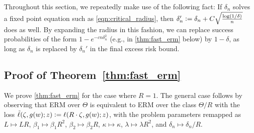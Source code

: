 \documentclass[11pt]{article} %
\newcommand{\pref}[1]{\cref{#1}}
\theoremstyle{theorem}  %
\theoremstyle{plain}
\newcommand{\ls}{\ell}
\newcommand{\ldef}{\vcentcolon=}
\begin{document}
Throughout this section, we repeatedly make use of the following fact:
If $\delta_n$ solves a fixed point equation such as
\pref{eqn:critical_radius}, then $\delta'_n\ldef{}\delta_n +
C\sqrt{\frac{\log(1/\delta)}{n}}$ does as well. By expanding the
radius in this fashion, we can replace success probabilities of the
form $1-e^{-cn\delta_n^{2}}$ (e.g., in
\pref{thm:fast_erm} %
below) by  $1-\delta$, as long as $\delta_n$ is replaced by $\delta_n'$ in the final excess risk bound.

\subsection{Proof of Theorem~\ref*{thm:fast_erm}}
\label{sec:fast_erm_proof}

We prove \pref{thm:fast_erm} for the case where $R=1$. The general case follows by observing that ERM over $\Theta$ is equivalent to ERM over the class $\Theta/R$ with the loss $\tilde{\ls}(\zeta,g(w);z) \ldef{} \ls(R\cdot{}\zeta,g(w);z)$, with the problem parameters remapped as $L\mapsto{}LR$, $\beta_1\mapsto{}\beta_1R^2$, $\beta_2\mapsto\beta_2R$, $\kappa\mapsto\kappa$, $\lambda\mapsto\lambda{}R^{2}$, and $\delta_n\mapsto\delta_n/R$.

%
\end{document}
